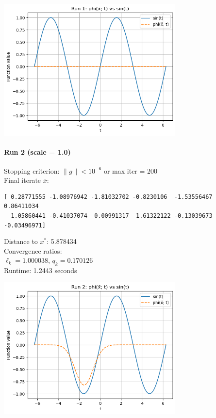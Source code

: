 \documentclass[12pt]{article}
\begin{document}
\includegraphics[width=0.7\textwidth]{figures/plot_1.png}

\paragraph{Run 2 (scale = 1.0)}
Stopping criterion: $\|g\| < 10^{-6}$ or max iter = 200\\
Final iterate $\bar{x}$:
\begin{verbatim}
[ 0.28771555 -1.08976942 -1.81032702 -0.8230106  -1.53556467  0.86411034
  1.05860441 -0.41037074  0.00991317  1.61322122 -0.13039673 -0.03496971]
\end{verbatim}
Distance to $x^*$: 5.878434\\
Convergence ratios: \\
$\ell_k = 1.000038$, $q_k = 0.170126$\\
Runtime: 1.2443 seconds

\includegraphics[width=0.7\textwidth]{figures/plot_2.png}
\end{document}
